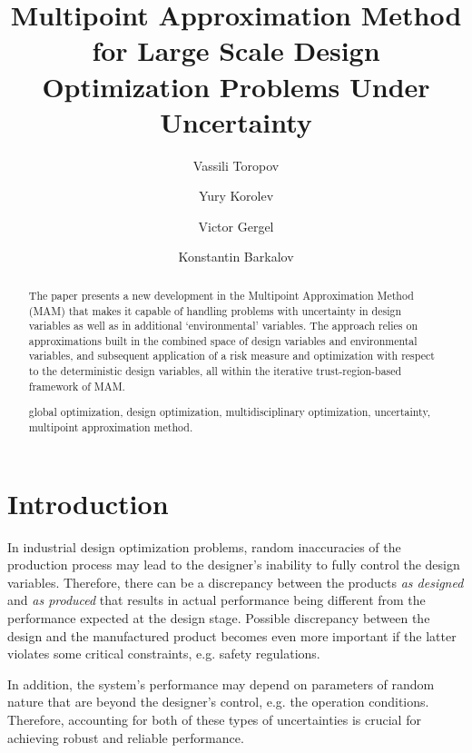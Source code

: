 \documentclass{llncs}
\begin{document}
\mainmatter 

\title{Multipoint Approximation Method for Large Scale Design Optimization Problems Under Uncertainty}
\author{Vassili Toropov  \and Yury Korolev  \and Victor Gergel  \and Konstantin Barkalov  %
\\
}


\maketitle

\begin{abstract}
The paper presents a new development in the Multipoint Approximation Method (MAM) that makes it capable of handling problems with uncertainty in design variables as well as in additional ‘environmental’ variables. The approach relies on approximations built in the combined space of design variables and environmental variables, and subsequent application of a risk measure and optimization with respect to the deterministic design variables, all within the iterative trust-region-based framework of MAM.

\keywords global optimization, design optimization, multidisciplinary optimization, uncertainty, multipoint approximation method.

\end{abstract}

\section{Introduction}
\label{sec:intro}
In industrial design optimization problems, random inaccuracies of the production process may lead to the designer’s inability to fully control the design variables. Therefore, there can be a discrepancy between the products \textit{as designed} and \textit{as produced} that results in actual performance being different from the performance expected at the design stage. Possible discrepancy between the design and the manufactured product becomes even more important if the latter violates some critical constraints, e.g. safety regulations.

In addition, the system’s performance may depend on parameters of random nature that are beyond the designer’s control, e.g. the operation conditions. Therefore,  accounting for both of these types of uncertainties  is crucial for achieving robust and reliable performance.
\end{document}

